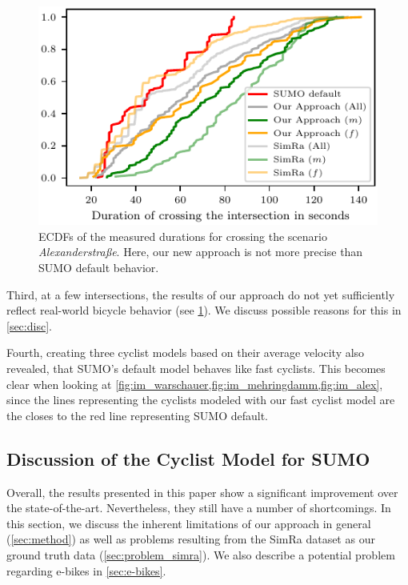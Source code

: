 \begin{figure}[t]
    \centering
    \includegraphics[width=\columnwidth]{fig/im_alex_ecdf_every.pdf}
    \caption{%
        ECDFs of the measured durations for crossing the scenario \textit{Alexanderstraße}.
        Here, our new approach is not more precise than SUMO default behavior.
    }%
    \label{fig:im_alex}
\end{figure}

Third, at a few intersections, the results of our approach do not yet sufficiently reflect real-world bicycle behavior (see \cref{fig:im_alex}).
We discuss possible reasons for this in \cref{sec:disc}.

Fourth, creating three cyclist models based on their average velocity also revealed, that SUMO's default model behaves like fast cyclists.
This becomes clear when looking at \cref{fig:im_warschauer,fig:im_mehringdamm,fig:im_alex}, since the lines representing the cyclists modeled with our fast cyclist model are the closes to the red line representing SUMO default.


\subsection{Discussion of the Cyclist Model for SUMO}
\label{subsec:discussion_sumo}
Overall, the results presented in this paper show a significant improvement over the state-of-the-art.
Nevertheless, they still have a number of shortcomings.
In this section, we discuss the inherent limitations of our approach in general (\cref{sec:method}) as well as problems resulting from the SimRa dataset as our ground truth data (\cref{sec:problem_simra}).
We also describe a potential problem regarding e-bikes in \cref{sec:e-bikes}.


